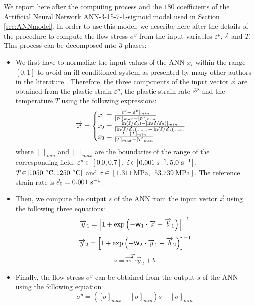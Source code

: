 \documentclass[twoside,english,1p,final,sort&compress]{elsarticle}
\theoremstyle{plain}
\DeclareRobustCommand{\w}{\mbox{\large\ensuremath{\mathsf{w}}}}
\DeclareRobustCommand{\dotp}{\boldsymbol{\cdot}}
\DeclareRobustCommand{\mdot}[1]{\accentset{\mbox{\bfseries .}}{#1}}
\DeclareRobustCommand{\ps}{\text{s}^{-1}}
\DeclareRobustCommand{\MPa}{\text{MPa}}
\begin{document}
We report here after the computing process and the $180$ coefficients of the Artificial Neural Network ANN-3-15-7-1-sigmoid model used in Section \ref{sec:ANNmodel}.
In order to use this model, we describe here after the details of the procedure to compute the flow stress $\sigma^y$ from the input variables $\varepsilon^p$, $\mdot\varepsilon$ and $T$.
This process can be decomposed into 3 phases:
\begin{itemize}
\item We first have to normalize the input values of the ANN $x_i$ within the range $[0,1]$ to avoid an ill-conditioned system as presented by many other authors in the literature \cite{Lin-2008-ANN, Lu-2011-ANN}.
Therefore, the three components of the input vector $\overrightarrow{x}$ are obtained from the plastic strain $\varepsilon^p$, the plastic strain rate $\mdot{\varepsilon}^p$ and the temperature $T$ using the following expressions:
\begin{equation}
\overrightarrow{x}=
\begin{cases}
x_1 = \frac{\varepsilon^p - [\varepsilon^p]_{min}}{[\varepsilon^p]_{max} - [\varepsilon^p]_{min}}\\
x_2 = \frac{\ln(\mdot{\varepsilon}/\mdot{\varepsilon_0})-[\ln(\mdot{\varepsilon}/\mdot{\varepsilon_0})]_{min}}{[\ln(\mdot{\varepsilon}/\mdot{\varepsilon_0})]_{max}-[\ln(\mdot{\varepsilon}/\mdot{\varepsilon_0})]_{min}}\label{eq:CR1}\\
x_3 = \frac{T-[T]_{min}}{[T]_{max}-[T]_{min}}
\end{cases}
\end{equation}
where $[~]_{min}$ and $[~]_{max}$ are the boundaries of the range of the corresponding field: $\varepsilon^p\!\in\!\left[0.0,0.7\right]$, $\mdot{\varepsilon}\!\in\!\left[0.001~\ps,5.0~\ps\right]$, $T\!\in\!\left[1050~\celsius,1250~\celsius\right]$ and $\sigma\!\in\!\left[1.311~\MPa,153.739~\MPa\right]$.
The reference strain rate is $\mdot{\varepsilon_0} = 0.001~\ps$.
\item Then, we compute the output $s$ of the ANN from the input vector $\overrightarrow{x}$ using the following three equations:
\begin{equation}
\overrightarrow{y}_1 = \left[1 + \exp{\left(- \w_1 \dotp \overrightarrow{x}- \overrightarrow{b}_1\right)}\right]^{-1}
\end{equation}
\begin{equation}
\overrightarrow{y}_2 = \left[1 + \exp{\left(- \w_2 \dotp \overrightarrow{y}_1- \overrightarrow{b}_2\right)}\right]^{-1}
\end{equation}
\begin{equation}
s = \overrightarrow{w}^T \dotp \overrightarrow{y}_2 + b
\end{equation}
\item Finally, the flow stress $\sigma^y$ can be obtained from the output $s$ of the ANN using the following equation:
\begin{equation}
\sigma^y = \left([\sigma]_{max}-[\sigma]_{min}\right)s + [\sigma]_{min} \label{eq:CR2}
\end{equation}
\end{itemize}
\end{document}
